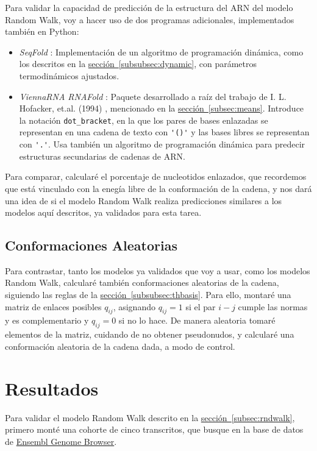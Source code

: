 \documentclass[a4paper,11pt,titlepage]{article}
\newcommand{\nr}[2][sección]{\hyperref[#2]{#1~\ref{#2}}}
\theoremstyle{definition}
\begin{document}
Para validar la capacidad de predicción de la estructura del ARN del modelo Random Walk, voy a hacer uso de dos programas adicionales, implementados también en Python:

\begin{itemize}
    \item \textit{SeqFold} \cite{seqfold}: Implementación de un algoritmo de programación dinámica, como los descritos en la \nr[sección]{subsubsec:dynamic}, con parámetros termodinámicos ajustados.
    \item \textit{ViennaRNA RNAFold} \cite{viennarna}: Paquete desarrollado a raíz del trabajo de  I. L. Hofacker, et.al. (1994) \cite{hofacker}, mencionado en la \nr[sección]{subsec:means}. Introduce la notación \verb|dot_bracket|, en la que los pares de bases enlazadas se representan en una cadena de texto con \verb|'()'| y las bases libres se representan con \verb|'.'|. Usa también un algoritmo de programación dinámica para predecir estructuras secundarias de cadenas de ARN.
\end{itemize}

Para comparar, calcularé el porcentaje de nucleotidos enlazados, que recordemos que está vinculado con la enegía libre de la conformación de la cadena, y nos dará una idea de si el modelo Random Walk realiza predicciones similares a los modelos aquí descritos, ya validados para esta tarea.

\subsection{Conformaciones Aleatorias}\label{subsec:randomconf}

Para contrastar, tanto los modelos ya validados que voy a usar, como los modelos Random Walk, calcularé también conformaciones aleatorias de la cadena, siguiendo las reglas de la \nr[sección]{subsubsec:thbasis}. Para ello, montaré una matriz de enlaces posibles $q_{ij}$, asignando $q_{ij} = 1$ si el par $i-j$ cumple las normas y es complementario y $q_{ij} = 0$ si no lo hace. De manera aleatoria tomaré elementos de la matriz, cuidando de no obtener pseudonudos, y calcularé una conformación aleatoria de la cadena dada, a modo de control.

\newpage
\section{Resultados}\label{sec:res}

Para validar el modelo Random Walk descrito en la \nr[sección]{subsec:rndwalk}, primero monté una cohorte de cinco transcritos, que busque en la base de datos de \href{https://www.ensembl.org/index.html}{Ensembl Genome Browser}. %
\end{document}

